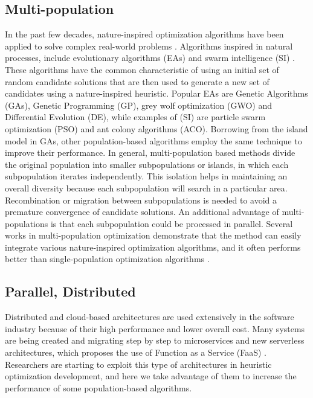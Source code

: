 \documentclass[runningheads]{llncs}
\begin{document}
\subsection{Multi-population}
In the past few decades, nature-inspired optimization algorithms have been
applied to solve complex real-world problems \cite{yang2014nature}. Algorithms
inspired in natural processes,  include evolutionary algorithms (EAs)
\cite{back1996evolutionary} and swarm intelligence (SI) \cite{kennedy2006swarm}.
These algorithms have the common characteristic of using an initial set of
random candidate solutions that are then used to generate a new set of
candidates using a nature-inspired heuristic. Popular EAs are Genetic Algorithms
(GAs), Genetic Programming (GP), grey wolf optimization (GWO) and Differential
Evolution (DE), while examples of (SI) are particle swarm optimization (PSO) and
ant colony algorithms (ACO). Borrowing from the island model in GAs, other
population-based algorithms employ the same technique to improve their
performance. In general, multi-population based methods divide the original
population into smaller subpopulations or islands, in which each subpopulation
iterates independently. This isolation helps in maintaining an overall diversity
because each subpopulation will search in a particular area. Recombination or
migration between subpopulations is needed to avoid a premature convergence of
candidate solutions. An additional advantage of multi-populations is that each
subpopulation could be processed in parallel. Several works in multi-population
optimization demonstrate \cite{wu2016differential} that the method can easily
integrate various nature-inspired optimization algorithms, and it often performs
better than single-population optimization algorithms \cite{ma2019multi}.


\subsection{Parallel, Distributed}
Distributed and cloud-based architectures are used extensively in the software
industry because of their high performance and lower overall cost. Many systems
are being created and migrating step by step to microservices and new serverless
architectures, which proposes the use of Function as a Service (FaaS) 
\cite{Hellerstein2018,Everywhere,Baird2016}. 
Researchers are starting to exploit this type of architectures in heuristic optimization
development, and here we take advantage of them to increase the performance of
some population-based algorithms.
\end{document}

